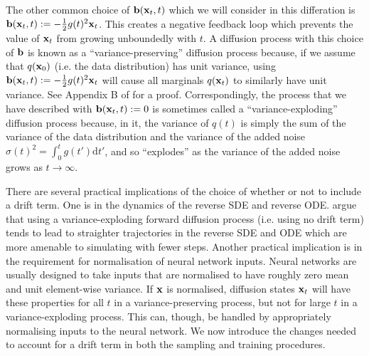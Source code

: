 The other common choice of ${\mathbf{b}}({\mathbf{x}}_t, t)$ which we will consider in this differation is ${\mathbf{b}}({\mathbf{x}}_t, t) := - \frac{1}{2}g(t)^2{\mathbf{x}}_t$. This creates a negative feedback loop which prevents the value of ${\mathbf{x}}_t$ from growing unboundedly with $t$. A diffusion process with this choice of ${\mathbf{b}}$ is known as a ``variance-preserving'' diffusion process because, if we assume that $q({\mathbf{x}}_0)$ (i.e. the data distribution) has unit variance, using ${\mathbf{b}}({\mathbf{x}}_t, t) := - \frac{1}{2}g(t)^2{\mathbf{x}}_t$ will cause all marginals $q({\mathbf{x}}_t)$ to similarly have unit variance. See Appendix B of \citet{song2020score} for a proof. Correspondingly, the process that we have described with ${\mathbf{b}}({\mathbf{x}}_t, t) := 0$ is sometimes called a ``variance-exploding'' diffusion process because, in it, the variance of $q(t)$ is simply the sum of the variance of the data distribution and the variance of the added noise $\sigma(t)^2 = \int_0^t g(t') \mathrm{d}t'$, and so ``explodes'' as the variance of the added noise grows as $t \rightarrow \infty$.

There are several practical implications of the choice of whether or not to include a drift term. One is in the dynamics of the reverse SDE and reverse ODE. \citet{karras2022elucidating} argue that using a variance-exploding forward diffusion process (i.e. using no drift term) tends to lead to straighter trajectories in the reverse SDE and ODE which are more amenable to simulating with fewer steps. Another practical implication is in the requirement for normalisation of neural network inputs. Neural networks are usually designed to take inputs that are normalised to have roughly zero mean and unit element-wise variance. If ${\mathbf{x}}$ is normalised, diffusion states ${\mathbf{x}}_t$ will have these properties for all $t$ in a variance-preserving process, but not for large $t$ in a variance-exploding process. This can, though, be handled by appropriately normalising inputs to the neural network. We now introduce the changes needed to account for a drift term in both the sampling and training procedures.




